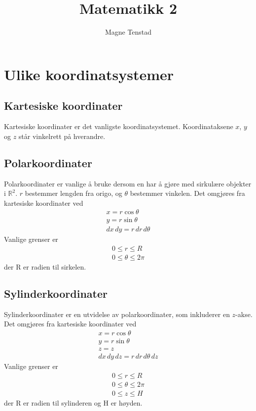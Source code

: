 \documentclass{article}
\title{Matematikk 2}
\author{Magne Tenstad}
\begin{document}
\maketitle

\clearpage

\tableofcontents

\clearpage




\section{Ulike koordinatsystemer}


\subsection{Kartesiske koordinater}
Kartesiske koordinater er det vanligste koordinatsystemet. Koordinataksene $x$, $y$ og $z$ står vinkelrett på hverandre.


\subsection{Polarkoordinater}
Polarkoordinater er vanlige å bruke dersom en har å gjøre med sirkulære objekter i $\mathbb{R}^2$. $r$ bestemmer lengden fra origo, og $\theta$ bestemmer vinkelen. Det omgjøres fra kartesiske koordinater ved
\begin{gather*}
    x = r\cos{\theta}\\
    y = r\sin{\theta}\\
    dx\,dy = r\,dr\,d\theta
\end{gather*}
Vanlige grenser er
\begin{gather*}
    0 \leq r \leq R\\
    0 \leq \theta \leq 2\pi
\end{gather*}
der R er radien til sirkelen.


\subsection{Sylinderkoordinater}
Sylinderkoordinater er en utvidelse av polarkoordinater, som inkluderer en $z$-akse.
Det omgjøres fra kartesiske koordinater ved
\begin{gather*}
    x = r\cos{\theta}\\
    y = r\sin{\theta}\\
    z = z\\
    dx\,dy\,dz = r\,dr\,d\theta\,dz
\end{gather*}
Vanlige grenser er
\begin{gather*}
    0 \leq r \leq R\\
    0 \leq \theta \leq 2\pi\\
    0 \leq z \leq H
\end{gather*}
der R er radien til sylinderen og H er høyden.
\end{document}
